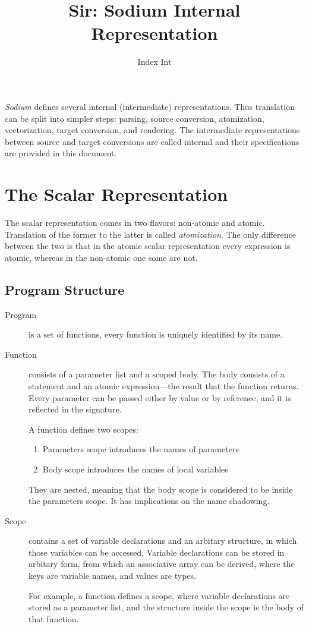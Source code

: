 \documentclass [a4paper] {article}
\title { Sir: Sodium Internal Representation }
\author { Index Int }
\begin{document}
\maketitle

\emph{Sodium} defines several internal (intermediate) representations. Thus
translation can be split into simpler steps: parsing, source conversion,
atomization, vectorization, target conversion, and rendering. The intermediate
representations between source and target conversions are called internal and
their specifications are provided in this document.

\section { The Scalar Representation }

The scalar representation comes in two flavors: non-atomic and atomic.
Translation of the former to the latter is called \emph{atomization}. The only
difference between the two is that in the atomic scalar representation
every expression is atomic, whereas in the non-atomic one some are not.

\subsection { Program Structure }

\begin {description}

\item [Program] is a set of functions, every function is uniquely identified by
its name.

\item [Function] consists of a parameter list and a scoped body. The body
consists of a statement and an atomic expression---the result that the function
returns. Every parameter can be passed either by value or by reference, and it
is reflected in the signature.

A function defines two scopes:
\begin {enumerate}
\item Parameters scope introduces the names of parameters
\item Body scope introduces the names of local variables
\end {enumerate}

They are nested, meaning that the body scope is considered to be inside the
parameters scope. It has implications on the name shadowing.

\item [Scope] contains a set of variable declarations and an arbitary structure,
in which those variables can be accessed. Variable declarations can be stored in
arbitary form, from which an associative array can be derived, where the keys
are variable names, and values are types.

For example, a function defines a scope, where variable declarations are stored
as a parameter list, and the structure inside the scope is the body of that
function.

\end {description}
\end{document}
